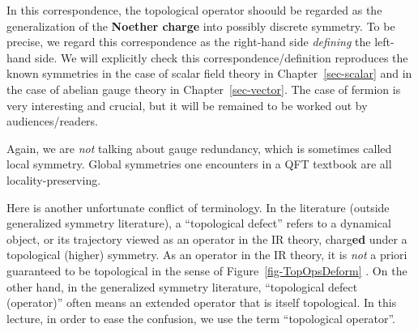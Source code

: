 \documentclass[
  letterpaper,
  DIV=11,
  numbers=noendperiod]{scrreport}
\begin{document}
In this correspondence, the topological operator shoould be regarded as
the generalization of the \textbf{Noether charge} into possibly discrete
symmetry. To be precise, we regard this correspondence as the right-hand
side \emph{defining} the left-hand side. We will explicitly check this
correspondence/definition reproduces the known symmetries in the case of
scalar field theory in Chapter~\ref{sec-scalar} and in the case of
abelian gauge theory in Chapter~\ref{sec-vector}. The case of fermion is
very interesting and crucial, but it will be remained to be worked out
by audiences/readers.

\begin{tcolorbox}[enhanced jigsaw, bottomtitle=1mm, colback=white, toprule=.15mm, coltitle=black, opacityback=0, toptitle=1mm, arc=.35mm, left=2mm, title=\textcolor{quarto-callout-note-color}{\faInfo}\hspace{0.5em}{\textsf{Terminology (locality-preserving)}}, rightrule=.15mm, titlerule=0mm, leftrule=.75mm, colbacktitle=quarto-callout-note-color!10!white, opacitybacktitle=0.6, breakable, bottomrule=.15mm, colframe=quarto-callout-note-color-frame]

Again, we are \emph{not} talking about gauge redundancy, which is
sometimes called local symmetry. Global symmetries one encounters in a
QFT textbook are all locality-preserving.

\end{tcolorbox}

\begin{tcolorbox}[enhanced jigsaw, bottomtitle=1mm, colback=white, toprule=.15mm, coltitle=black, opacityback=0, toptitle=1mm, arc=.35mm, left=2mm, title=\textcolor{quarto-callout-note-color}{\faInfo}\hspace{0.5em}{\textsf{Terminology (topological defect)}}, rightrule=.15mm, titlerule=0mm, leftrule=.75mm, colbacktitle=quarto-callout-note-color!10!white, opacitybacktitle=0.6, breakable, bottomrule=.15mm, colframe=quarto-callout-note-color-frame]

Here is another unfortunate conflict of terminology. In the literature
(outside generalized symmetry literature), a ``topological defect''
refers to a dynamical object, or its trajectory viewed as an operator in
the IR theory, charg\textbf{ed} under a topological (higher) symmetry.
As an operator in the IR theory, it is \emph{not} a priori guaranteed to
be topological in the sense of Figure~\ref{fig-TopOpsDeform} . On the
other hand, in the generalized symmetry literature, ``topological defect
(operator)'' often means an extended operator that is itself
topological. In this lecture, in order to ease the confusion, we use the
term ``topological operator''.

\end{tcolorbox}
\end{document}
